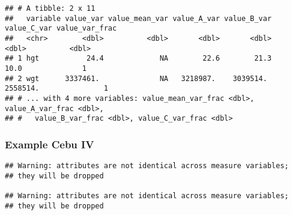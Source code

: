 \documentclass[
]{book}
\newenvironment{Shaded}{\begin{snugshade}}{\end{snugshade}}
\newcommand{\DataTypeTok}[1]{\textcolor[rgb]{0.13,0.29,0.53}{#1}}
\newcommand{\DecValTok}[1]{\textcolor[rgb]{0.00,0.00,0.81}{#1}}
\newcommand{\KeywordTok}[1]{\textcolor[rgb]{0.13,0.29,0.53}{\textbf{#1}}}
\newcommand{\NormalTok}[1]{#1}
\newcommand{\OperatorTok}[1]{\textcolor[rgb]{0.81,0.36,0.00}{\textbf{#1}}}
\newcommand{\OtherTok}[1]{\textcolor[rgb]{0.56,0.35,0.01}{#1}}
\newcommand{\StringTok}[1]{\textcolor[rgb]{0.31,0.60,0.02}{#1}}
\begin{document}
\begin{Shaded}
\end{Shaded}

\begin{verbatim}
## # A tibble: 2 x 11
##   variable value_var value_mean_var value_A_var value_B_var value_C_var value_var_frac
##   <chr>        <dbl>          <dbl>       <dbl>       <dbl>       <dbl>          <dbl>
## 1 hgt           24.4             NA        22.6        21.3        10.0              1
## 2 wgt      3337461.              NA   3218987.    3039514.    2558514.               1
## # ... with 4 more variables: value_mean_var_frac <dbl>, value_A_var_frac <dbl>,
## #   value_B_var_frac <dbl>, value_C_var_frac <dbl>
\end{verbatim}

\hypertarget{example-cebu-iv}{%
\subsubsection{Example Cebu IV}\label{example-cebu-iv}}

\begin{Shaded}
\end{Shaded}

\begin{verbatim}
## Warning: attributes are not identical across measure variables;
## they will be dropped

## Warning: attributes are not identical across measure variables;
## they will be dropped
\end{verbatim}
\end{document}
